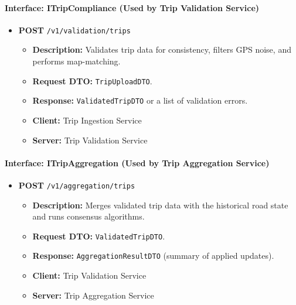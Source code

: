 \paragraph{Interface: ITripCompliance (Used by Trip Validation Service)}
\begin{itemize}
    \item \textbf{POST} \texttt{/v1/validation/trips}
    \begin{itemize}
        \item \textbf{Description:} Validates trip data for consistency, filters GPS noise, and performs map-matching.
        \item \textbf{Request DTO:} \texttt{TripUploadDTO}.
        \item \textbf{Response:} \texttt{ValidatedTripDTO} or a list of validation errors.
        \item \textbf{Client:} Trip Ingestion Service
        \item \textbf{Server:} Trip Validation Service
    \end{itemize}
\end{itemize}

\paragraph{Interface: ITripAggregation (Used by Trip Aggregation Service)}
\begin{itemize}
    \item \textbf{POST} \texttt{/v1/aggregation/trips}
    \begin{itemize}
        \item \textbf{Description:} Merges validated trip data with the historical road state and runs consensus algorithms.
        \item \textbf{Request DTO:} \texttt{ValidatedTripDTO}.
        \item \textbf{Response:} \texttt{AggregationResultDTO} (summary of applied updates).
        \item \textbf{Client:} Trip Validation Service
        \item \textbf{Server:} Trip Aggregation Service
    \end{itemize}
\end{itemize}

